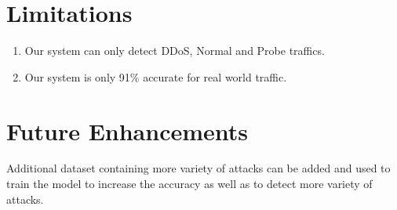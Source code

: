 \section{Limitations}
\begin{enumerate}[label=\roman*.]
	\item Our system can only detect DDoS, Normal and Probe traffics.
	\item Our system is only 91\% accurate for real world traffic.
\end{enumerate}
\section{Future Enhancements}
\vspace{-18pt}
Additional dataset containing more variety of attacks can be added and used to train the model to increase the accuracy as well as to detect more variety of attacks.
